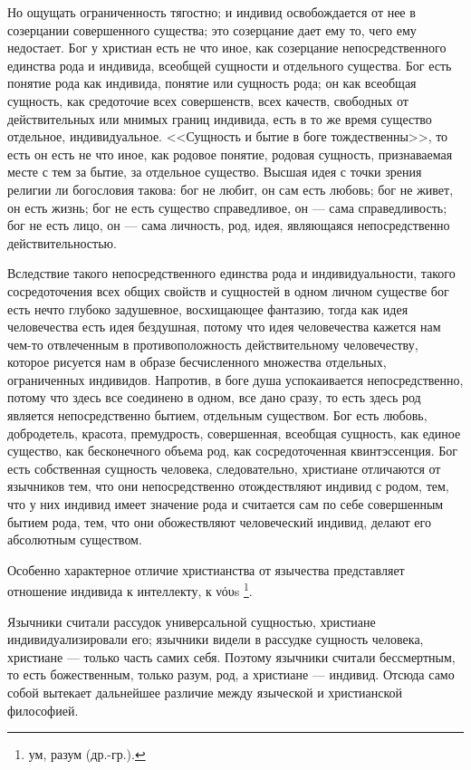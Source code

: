 \documentclass[12pt,oneside]{book}
\newcommand{\textgreek}[1]{
\begingroup\fontencoding{LGR}\selectfont#1\endgroup
}
\begin{document}
Но ощущать ограниченность тягостно; и индивид освобождается от нее в созерцании совершенного существа; это созерцание дает ему то, чего ему недостает. Бог у христиан есть не что иное, как созерцание непосредственного единства рода и индивида, всеобщей сущности и отдельного существа. Бог есть понятие рода как индивида, понятие или сущность рода; он как всеобщая сущность, как средоточие всех совершенств, всех качеств, свободных от действительных или мнимых границ индивида, есть в то же время существо отдельное, индивидуальное. <<Сущность и бытие в боге тождественны>>, то есть он есть не что иное, как родовое понятие, родовая сущность, признаваемая месте с тем за бытие, за отдельное существо. Высшая идея с точки зрения религии ли богословия такова: бог не любит, он сам есть любовь; бог не живет, он есть жизнь; бог не есть существо справедливое, он --- сама справедливость; бог не есть лицо, он --- сама личность, род, идея, являющаяся непосредственно действительностью.

Вследствие такого непосредственного единства рода и индивидуальности, такого сосредоточения всех общих свойств и сущностей в одном личном существе бог есть нечто глубоко задушевное, восхищающее фантазию, тогда как идея человечества есть идея бездушная, потому что идея человечества кажется нам чем-то отвлеченным в противоположность действительному человечеству, которое рисуется нам в образе бесчисленного множества отдельных, ограниченных индивидов. Напротив, в боге душа успокаивается непосредственно, потому что здесь все соединено в одном, все дано сразу, то есть здесь род является непосредственно бытием, отдельным существом. Бог есть любовь, добродетель, красота, премудрость, совершенная, всеобщая сущность, как единое существо, как бесконечного объема род, как сосредоточенная квинтэссенция. Бог есть собственная сущность человека, следовательно, христиане отличаются от язычников тем, что они непосредственно отождествляют индивид с родом, тем, что у них индивид имеет значение рода и считается сам по себе совершенным бытием рода, тем, что они обожествляют человеческий индивид, делают его абсолютным существом.

Особенно характерное отличие христианства от язычества представляет отношение индивида к интеллекту, к \textgreek{νόυs}\footnote{ум, разум (др.-гр.).}.

Язычники считали рассудок универсальной сущностью, христиане индивидуализировали его; язычники видели в рассудке сущность человека, христиане --- только часть самих себя. Поэтому язычники считали бессмертным, то есть божественным, только разум, род, а христиане --- индивид. Отсюда само собой вытекает дальнейшее различие между языческой и христианской философией.
\end{document}
